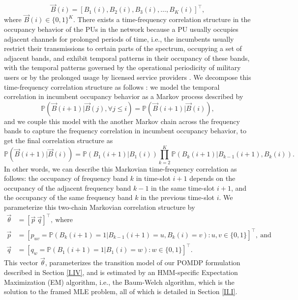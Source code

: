 \documentclass[12pt, draftcls, onecolumn]{IEEEtran}
\begin{document}
\begin{equation}\label{4}
    \vec{B}(i)=[B_{1}(i),B_{2}(i),B_{3}(i),\dots,B_{K}(i)]^{\intercal},
\end{equation}
where $\vec{B}(i){\in}\{0,1\}^{K}$. There exists a time-frequency correlation structure in the occupancy behavior of the PUs in the network because a PU usually occupies adjacent channels for prolonged periods of time, i.e., the incumbents usually restrict their transmissions to certain parts of the spectrum, occupying a set of adjacent bands, and exhibit temporal patterns in their occupancy of these bands, with the temporal patterns governed by the operational periodicity of military users or by the prolonged usage by licensed service providers \cite{WCL:12}. We decompose this time-frequency correlation structure as follows \cite{WCL:paper}: we model the temporal correlation in incumbent occupancy behavior as a Markov process described by
\begin{equation}\label{5}
    \mathbb{P}(\vec{B}(i+1)|\vec{B}(j),\forall j \leq i)=\mathbb{P}(\vec{B}(i+1)|\vec{B}(i)),
\end{equation}
and we couple this model with the another Markov chain across the frequency bands to capture the frequency correlation in incumbent occupancy behavior, to get the final correlation structure as
\begin{equation}\label{6}
    \mathbb{P}(\vec{B}(i+1)|\vec{B}(i))=\mathbb{P}(B_{1}(i+1)|B_{1}(i))\prod_{k=2}^{K}\mathbb{P}(B_{k}(i+1)|B_{k-1}(i+1),B_{k}(i)).
\end{equation}
In other words, we can describe this Markovian time-frequency correlation as follows: the occupancy of frequency band $k$ in time-slot $i+1$ depends on the occupancy of the adjacent frequency band $k-1$ in the same time-slot $i+1$, and the occupancy of the same frequency band $k$ in the previous time-slot $i$. We parameterize this two-chain Markovian correlation structure by
\begin{equation}\label{7}
    \begin{aligned}
        \vec{\theta}&=[\vec{p}\ \vec{q}]^{\intercal},\ \text{where}\\
        \vec{p}&=[p_{uv}=\mathbb{P}(B_{k}(i+1)=1|B_{k-1}(i+1)=u,B_{k}(i)=v):u,v \in \{0,1\}]^{\intercal},\ \text{and}\\
        \vec{q}&=[q_{w}=\mathbb{P}(B_{1}(i+1)=1|B_{1}(i)=w):w \in \{0,1\}]^{\intercal}.
    \end{aligned}
\end{equation}
This vector $\vec{\theta}$, parameterizes the transition model of our POMDP formulation described in Section \ref{I.IV}, and is estimated by an HMM-specific Expectation Maximization (EM) algorithm, i.e., the Baum-Welch algorithm, which is the solution to the framed MLE problem, all of which is detailed in Section \ref{II.I}.
\end{document}

